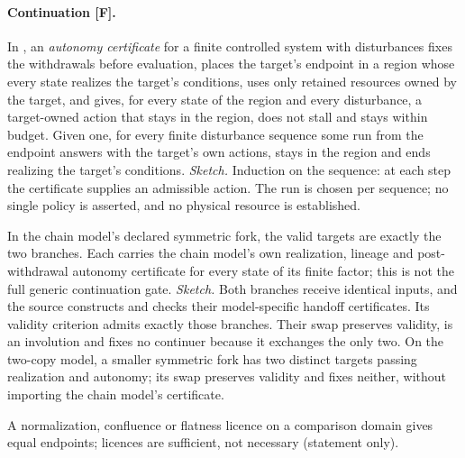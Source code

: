 \documentclass[pdflatex,sn-basic]{sn-jnl}%
\begin{document}
\begin{appendices}
\paragraph{Continuation [F].} In \citet{tsiokos2026copy}, an \emph{autonomy certificate} for a finite controlled system with disturbances fixes the withdrawals before evaluation, places the target's endpoint in a region whose every state realizes the target's conditions, uses only retained resources owned by the target, and gives, for every state of the region and every disturbance, a target-owned action that stays in the region, does not stall and stays within budget. Given one, for every finite disturbance sequence some run from the endpoint answers with the target's own actions, stays in the region and ends realizing the target's conditions. \emph{Sketch.} Induction on the sequence: at each step the certificate supplies an admissible action. The run is chosen per sequence; no single policy is asserted, and no physical resource is established.

In the chain model's declared symmetric fork, the valid targets are exactly the two branches. Each carries the chain model's own realization, lineage and post-withdrawal autonomy certificate for every state of its finite factor; this is not the full generic continuation gate. \emph{Sketch.} Both branches receive identical inputs, and the source constructs and checks their model-specific handoff certificates. Its validity criterion admits exactly those branches. Their swap preserves validity, is an involution and fixes no continuer because it exchanges the only two. On the two-copy model, a smaller symmetric fork has two distinct targets passing realization and autonomy; its swap preserves validity and fixes neither, without importing the chain model's certificate.

A normalization, confluence or flatness licence on a comparison domain gives equal endpoints; licences are sufficient, not necessary (statement only).


\end{appendices}
\end{document}
